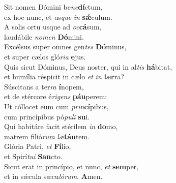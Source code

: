 \evenverse Sit nomen Dómini be\textit{ne}\textbf{dí}ctum,~\*\\
\evenverse ex hoc nunc, et us\textit{que} \textit{in} \textbf{sǽ}culum.\\
\oddverse A solis ortu usque ad \textit{oc}\textbf{cá}sum,~\*\\
\oddverse laudábile \textit{no}\textit{men} \textbf{Dó}mini.\\
\evenverse Excélsus super omnes gen\textit{tes} \textbf{Dó}minus,~\*\\
\evenverse et super cælos gló\textit{ri}\textit{a} \textbf{e}jus.\\
\oddverse Quis sicut Dóminus, Deus noster, qui in al\textit{tis} \textbf{há}bitat,~\*\\
\oddverse et humília réspicit in cælo \textit{et} \textit{in} \textbf{ter}ra?\\
\evenverse Súscitans a ter\textit{ra} \textbf{í}nopem,~\*\\
\evenverse et de stércore é\textit{ri}\textit{gens} \textbf{páu}perem:\\
\oddverse Ut cóllocet eum cum \textit{prin}\textbf{cí}pibus,~\*\\
\oddverse cum princípibus pó\textit{pu}\textit{li} \textbf{su}i.\\
\evenverse Qui habitáre facit stérilem \textit{in} \textbf{do}mo,~\*\\
\evenverse matrem filió\textit{rum} \textit{læ}\textbf{tán}tem.\\
\oddverse Glória Patri, \textit{et} \textbf{Fí}lio,~\*\\
\oddverse et Spirí\textit{tu}\textit{i} \textbf{San}cto.\\
\evenverse Sicut erat in princípio, et nunc, \textit{et} \textbf{sem}per,~\*\\
\evenverse et in sǽcula sæcu\textit{ló}\textit{rum}. \textbf{A}men.\\
